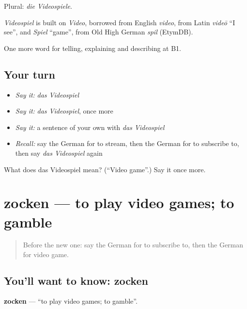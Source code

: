 Plural: \emph{die Videospiele}.

\begin{cousinweb}
\emph{Videospiel} is built on \emph{Video}, borrowed from English \emph{video}, from Latin \emph{videō} \textquotedblleft{}I see\textquotedblright{}, and \emph{Spiel} \textquotedblleft{}game\textquotedblright{}, from Old High German \emph{spil} (EtymDB).
\end{cousinweb}

\begin{grammarlens}[title={What you've built}]
One more word for telling, explaining and describing at B1.
\end{grammarlens}

\subsection*{Your turn}
\begin{itemize}
\raggedright
  \item \emph{Say it:} \emph{das Videospiel}
  \item \emph{Say it:} \emph{das Videospiel}, once more
  \item \emph{Say it:} a sentence of your own with \emph{das Videospiel}
  \item \emph{Recall:} say the German for to stream, then the German for to subscribe to, then say \emph{das Videospiel} again
\end{itemize}

\begin{tcolorbox}[breakable,colback=teal!4,colframe=teal!35!black,title={Before you move on}]
What does das Videospiel mean? (\textquotedblleft{}Video game\textquotedblright{}.) Say it once more.
\end{tcolorbox}
\section[zocken]{zocken — to play video games; to gamble}

\label{lesson:GE-C525-zocken}



\begin{quote}
Before the new one: say the German for to subscribe to, then the German for video game.
\end{quote}

\subsection*{You'll want to know: zocken}
\textbf{zocken} — \textquotedblleft{}to play video games; to gamble\textquotedblright{}.

